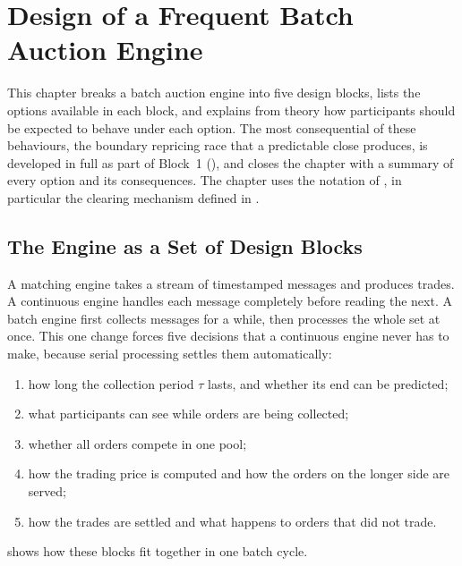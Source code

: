 \chapter{Design of a Frequent Batch Auction Engine}
\label{ch:design}

This chapter breaks a batch auction engine into five design blocks, lists the
options available in each block, and explains from theory how participants
should be expected to behave under each option. The most consequential of
these behaviours, the boundary repricing race that a predictable close
produces, is developed in full as part of Block~1
(), and  closes the
chapter with a summary of every option and its consequences. The chapter
uses the notation of , in particular the clearing
mechanism defined in .

\section{The Engine as a Set of Design Blocks}
\label{sec:blocks}

A matching engine takes a stream of timestamped messages and produces trades.
A continuous engine handles each message completely before reading the next.
A batch engine first collects messages for a while, then processes the whole
set at once. This one change forces five decisions that a continuous engine
never has to make, because serial processing settles them automatically:

\begin{enumerate}
  \item how long the collection period $\tau$ lasts, and whether its end can be
  predicted;
  \item what participants can see while orders are being collected;
  \item whether all orders compete in one pool;
  \item how the trading price is computed and how the orders on the longer
  side are served;
  \item how the trades are settled and what happens to orders that did not
  trade.
\end{enumerate}

 shows how these blocks fit together in one batch cycle.

